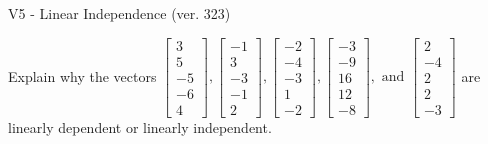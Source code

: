 \begin{exercise}
  \begin{exerciseTitle}V5 - Linear Independence (ver. 323)\end{exerciseTitle}
  \begin{exerciseStatement}
    Explain why the vectors \(\left[\begin{array}{r}
3 \\
5 \\
-5 \\
-6 \\
4
\end{array}\right] , \left[\begin{array}{r}
-1 \\
3 \\
-3 \\
-1 \\
2
\end{array}\right] , \left[\begin{array}{r}
-2 \\
-4 \\
-3 \\
1 \\
-2
\end{array}\right] , \left[\begin{array}{r}
-3 \\
-9 \\
16 \\
12 \\
-8
\end{array}\right] , \text{ and } \left[\begin{array}{r}
2 \\
-4 \\
2 \\
2 \\
-3
\end{array}\right]\) are linearly dependent or linearly independent.	



\end{exerciseStatement}
\end{exercise}
